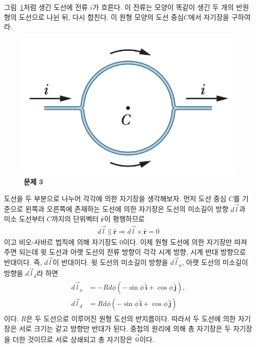 \documentclass[tightenlines,floatfix,nofootinbib,superscriptaddress,fleqn]{revtex4}
\begin{document}
\vspace{1cm}

그림~\ref{fig:3}처럼 생긴 도선에 전류 $i$가 흐른다. 이 전류는 모양이
똑같이 생긴 두 개의 반원형의 도선으로 나뉜 뒤, 다시 합친다. 이 원형
모양의 도선 중심$C$에서 자기장을 구하여라. 
\begin{figure}[htp]
  \centering
  \includegraphics[scale=0.55]{qfig10-1.png}
  \caption{\textbf{문제 3}}
  \label{fig:3}
\end{figure}

\vspace{1cm}
도선을 두 부분으로 나누어 각각에 의한 자기장을 생각해보자.
먼저 도선 중심 $C$를 기준으로 왼쪽과 오른쪽에 존재하는 도선에 의한 자기장은
도선의 미소길이 방향 $d\vec{l}$과 미소 도선부터 $C$까지의 단위벡터 $\hat{\bm r}$이
평행하므로
\begin{align}
  d\vec{l}\parallel \hat{\bm r} \Longrightarrow
  d\vec{l}\times \hat{\bm r}=0
\end{align}
이고 비오-사바르 법칙에 의해 자기장도 $0$이다.
이제 원형 도선에 의한 자기장만 따져주면 되는데 윗 도선과 아랫 도선의 전류 방향이
각각 시계 방향, 시계 반대 방향으로 반대이다. 즉, $d\vec{l}$이 반대이다. 윗 도선의
미소길이 방향을 $d\vec{l}_{u}$, 아랫 도선의 미소길이 방향을 $d\vec{l}_{d}$라 
하면
\begin{align}
  \begin{split}
    d\vec{l}_{u} &= -Rd\phi(-\sin\phi\,\hat{\bm i}+\cos\phi\,\hat{\bm j}), \\ 
    d\vec{l}_{d} &= Rd\phi(-\sin\phi\,\hat{\bm i}+\cos\phi\,\hat{\bm j})
  \end{split}
\end{align}
이다. $R$은 두 도선으로 이루어진 원형 도선의 반지름이다. 따라서 두 도선에 의한
자기장은 서로 크기는 같고 방향만 반대가 된다. 중첩의 원리에 의해 총 자기장은
두 자기장을 더한 것이므로 서로 상쇄되고 총 자기장은 $\vec{0}$이다.
\vspace{1cm}
\end{document}
